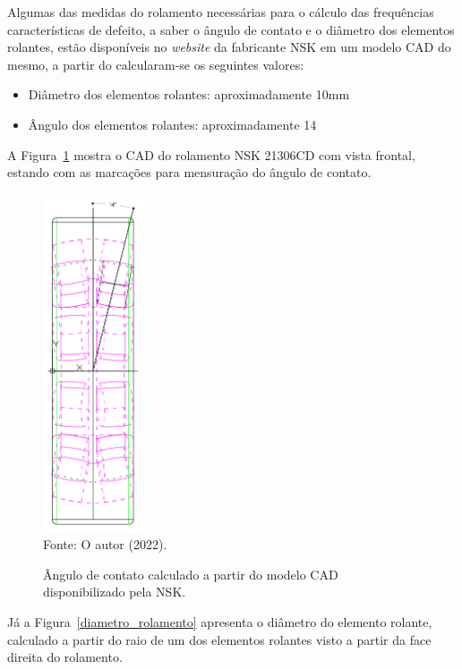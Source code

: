 \documentclass[
	12pt,				
	oneside,			
	a4paper,			
	english,			
	brazil,	
	sumario=abnt-6027-2012		
	]{abntex2ppgsi}
\begin{document}
Algumas das medidas do rolamento necessárias para o cálculo das frequências características de defeito, a saber o ângulo de contato e o diâmetro dos elementos rolantes, estão disponíveis no \textit{website} da fabricante NSK em um modelo CAD do mesmo, a partir do calcularam-se os seguintes valores:

\begin{itemize}
	\item Diâmetro dos elementos rolantes: aproximadamente 10\si{\mm}
	\item Ângulo dos elementos rolantes: aproximadamente 14\textdegree
\end{itemize}

A Figura~\ref{angulo_de_contato} mostra o CAD do rolamento NSK 21306CD com vista frontal, estando com as marcações para mensuração do ângulo de contato. 

\begin{figure}[H]
\centering
\caption {Ângulo de contato calculado a partir do modelo CAD disponibilizado pela NSK.}
\includegraphics[width=\textwidth,height=100mm,keepaspectratio]{angulo_de_contato} \\
Fonte: O autor (2022).
\label{angulo_de_contato}
\end{figure} 

Já a Figura~\ref{diametro_rolamento} apresenta o diâmetro do elemento rolante, calculado a partir do raio de um dos elementos rolantes visto a partir da face direita do rolamento. 
\end{document}
